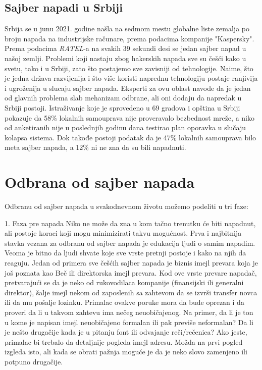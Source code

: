 \documentclass[a4paper]{article}
\begin{document}
{\subsection{Sajber napadi u Srbiji}

Srbija se u junu 2021. godine našla na sedmom mestu globalne liste zemalja po broju napada na industrijske računare, prema podacima kompanije "Kaspersky". Prema podacima \emph{RATEL}-a na svakih 39 sekundi desi se jedan sajber napad u našoj zemlji.
Problemi koji nastaju zbog hakerskih napada sve su češći kako u svetu, tako i u Srbiji, zato što postajemo sve zavisniji od tehnologije. Naime, što je jedna država razvijenija i što više koristi naprednu tehnologiju postaje ranjivija i ugroženija u slucaju sajber napada.
Eksperti za ovu oblast navode da je jedan od glavnih problema slab mehanizam odbrane, ali oni dodaju da napredak u Srbiji postoji.
Istraživanje koje je sprovedeno u 69 gradova i opština u Srbiji pokazuje da 58\% lokalnih samouprava nije proveravalo bezbednost mreže, a niko od anketiranih nije u poslednjih godinu dana testirao plan oporavka u slučaju kolapsa sistema. Dok takođe postoji podatak da je 47\% lokalnih samouprava bilo meta sajber napada, a 12\% ni ne zna da su bili napadnuti.

\section{Odbrana od sajber napada}


Odbranu od sajber napada u svakodnevnom životu možemo podeliti u tri faze:

1. Faza pre napada
Niko ne može da zna u kom tačno trenutku će biti napadnut, ali postoje koraci koji mogu minimizirati takvu mogućnost. Prva i najbitnija stavka vezana za odbranu od sajber napada je edukacija ljudi o samim napadim. Veoma je bitno da ljudi shvate koje sve vrste pretnji postoje i kako na njih da reaguju.
Jedan od primera sve češćih sajber napada je biznis imejl prevara koja je još poznata kao Beč ili direktorska imejl prevara. Kod ove vrste prevare napadač, pretvarajući se da je neko od rukovodilaca kompanije (finansijski ili generalni direktor), šalje imejl nekom od zaposlenih sa zahtevom da se izvrši transfer novca ili da mu pošalje lozinku. Primalac ovakve poruke mora da bude oprezan i da proveri da li u takvom zahtevu ima nečeg neuobičajenog. Na primer, da li je ton u kome je napisan imejl neuobičajeno formalan ili pak previše neformalan? Da li je nešto drugačije kada je u pitanju font ili odvajanje reči/rečenica? Ako jeste, primalac bi trebalo da detaljnije pogleda imejl adresu. Možda na prvi pogled izgleda isto, ali kada se obrati pažnja moguće je da je neko slovo zamenjeno ili potpuno drugačije.

}
\end{document}
